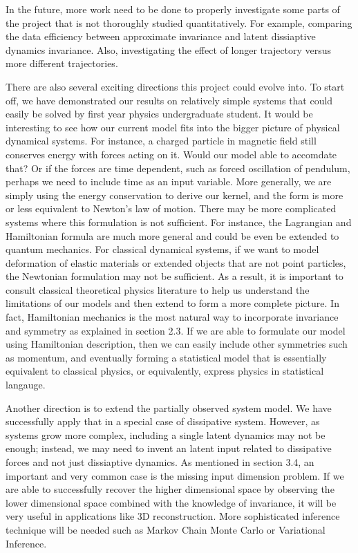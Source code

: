 \documentclass{statsmsc}
\begin{document}
In the future, more work need to be done to properly investigate some parts of the project that is not thoroughly studied quantitatively. For example, comparing the data efficiency between approximate invariance and latent dissiaptive dynamics invariance.
Also, investigating the effect of longer trajectory versus more different trajectories.

There are also several exciting directions this project could evolve into.
To start off, we have demonstrated our results on relatively simple systems that could easily be solved by first year physics undergraduate student. 
It would be interesting to see how our current model fits into the bigger picture of physical dynamical systems.
For instance, a charged particle in magnetic field still conserves energy with forces acting on it. 
Would our model able to accomdate that?
Or if the forces are time dependent, such as forced oscillation of pendulum, perhaps we need to include time as an input variable.
More generally, we are simply using the energy conservation to derive our kernel, and the form is more or less equivalent to Newton's law of motion.
There may be more complicated systems where this formulation is not sufficient.
For instance, the Lagrangian and Hamiltonian formula are much more general and could be even be extended to quantum mechanics.
For classical dynamical systems, if we want to model deformation of elastic materials or extended objects that are not point particles, the Newtonian formulation may not be sufficient.
As a result, it is important to consult classical theoretical physics literature to help us understand the limitations of our models and then extend to form a more complete picture.  
In fact, Hamiltonian mechanics is the most natural way to incorporate invariance and symmetry as explained in section 2.3.
If we are able to formulate our model using Hamiltonian description, then we can easily include other symmetries such as momentum, and eventually forming a statistical model that is essentially equivalent to classical physics, or equivalently, express physics in statistical langauge.

Another direction is to extend the partially observed system model.
We have successfully apply that in a special case of dissipative system.
However, as systems grow more complex, including a single latent dynamics may not be enough; instead, we may need to invent an latent input related to dissipative forces and not just dissiaptive dynamics.
As mentioned in section 3.4, an important and very common case is the missing input dimension problem.
If we are able to successfully recover the higher dimensional space by observing the lower dimensional space combined with the knowledge of invariance, it will be very useful in applications like 3D reconstruction.
More sophisticated inference technique will be needed such as Markov Chain Monte Carlo or Variational Inference.
\end{document}
